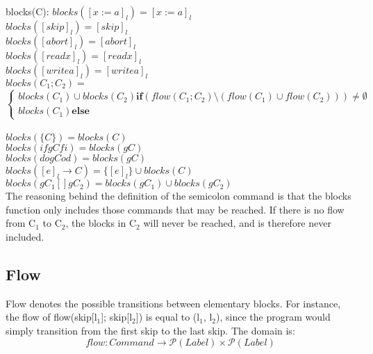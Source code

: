 \docpar
blocks(C):\newline
$blocks([x := a]_l)      = {[x := a]_l}$\\
$blocks([skip]_l)        = {[skip]_l}$\\
$blocks([abort]_l)       = {[abort]_l}$\\
$blocks([read x]_l)      = {[read x]_l}$\\
$blocks([write a]_l)     = {[write a]_l}$\\
$blocks(C_1; C_2)		 = $ $$
\begin{cases}
blocks(C_1) \cup blocks(C_2) \textbf{if} (flow(C_1; C_2) \setminus (flow(C_1) \cup flow(C_2))) \neq \emptyset\\
blocks(C_1) \textbf{else}
\end{cases}
$$\\
$blocks(\{C\})             = blocks(C)$\\
$blocks(if gC fi)        = blocks(gC)$\\
$blocks(do gC od)        = blocks(gC)$\\
$blocks([e]_l \to C)      = \{[e]_l\} \cup blocks(C)$\\
$blocks(gC_1 [] gC_2)= blocks(gC_1) \cup blocks(gC_2)$\\

The reasoning behind the definition of the semicolon command is that the
blocks function only includes those commands that may be reached. If there is
no flow from C$_1$ to C$_2$, the blocks in C$_2$ will never be reached, and is
therefore never included.



\subsection{Flow}

Flow denotes the possible transitions between elementary blocks.
For instance, the flow of flow(skip[l$_1$]; skip[l$_2$]) is equal to
(l$_1$, l$_2$), since the program would simply transition from the first
skip to the last skip. The domain is:
\[flow \colon Command \to \mathcal{P}(Label)\times\mathcal{P}(Label)\]

